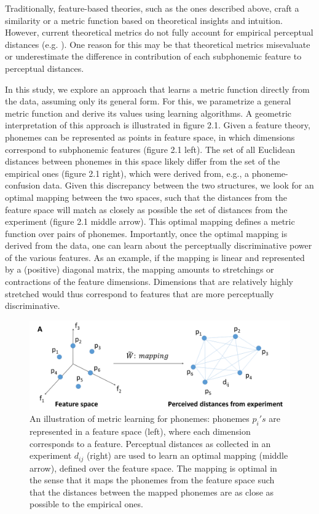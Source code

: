 Traditionally, feature-based theories, such as the ones described above, craft a similarity or a metric function based on theoretical insights and intuition. However, current theoretical metrics do not fully account for empirical perceptual distances (e.g. \citealp{Bailey2005}). One reason for this may be that theoretical metrics misevaluate or underestimate the difference in contribution of each subphonemic feature to perceptual distances. 

In this study, we explore an approach that learns a metric function directly from the data, assuming only its general form. For this, we parametrize a general metric function and derive its values using learning algorithms. A geometric interpretation of this approach is illustrated in figure 2.1. Given a feature theory, phonemes can be represented as points in feature space, in which dimensions correspond to subphonemic features (figure 2.1 left). The set of all Euclidean distances between phonemes in this space likely differ from the set of the empirical ones (figure 2.1 right), which were derived from, e.g., a phoneme-confusion data. Given this discrepancy between the two structures, we look for an optimal mapping between the two spaces, such that the distances from the feature space will match as closely as possible the set of distances from the experiment (figure 2.1 middle arrow). This optimal mapping defines a metric function over pairs of phonemes. Importantly, once the optimal mapping is derived from the data, one can learn about the perceptually discriminative power of the various features. As an example, if the mapping is linear and represented by a (positive) diagonal matrix, the mapping amounts to stretchings or contractions of the feature dimensions. Dimensions that are relatively highly stretched would thus correspond to features that are more perceptually discriminative.

\begin{figure}
\vspace{.3in}
\includegraphics[width=\linewidth]{Figures/Ch2/Figure1_2017Sep10.png}
\caption{An illustration of metric learning for phonemes: phonemes $p_i's$ are represented in a feature space (left), where each dimension corresponds to a feature. Perceptual distances as collected in an experiment $d_{ij}$ (right) are used to learn an optimal mapping (middle arrow), defined over the feature space. The mapping is optimal in the sense that it maps the phonemes from the feature space such that the distances between the mapped phonemes are as close as possible to the empirical ones.}
\end{figure}

